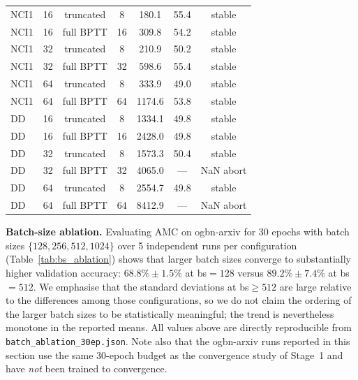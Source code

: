 \documentclass[a4paper,fleqn]{cas-dc}
\begin{document}
\begin{table}[htbp]
{\begin{tabular}{@{}lcccccc@{}}
NCI1     & 16 & truncated     & 8  & 180.1 & 55.4 & stable \\
NCI1     & 16 & full BPTT     & 16 & 309.8 & 54.2 & stable \\
NCI1     & 32 & truncated     & 8  & 210.9 & 50.2 & stable \\
NCI1     & 32 & full BPTT     & 32 & 598.6 & 55.4 & stable \\
NCI1     & 64 & truncated     & 8  & 333.9 & 49.0 & stable \\
NCI1     & 64 & full BPTT     & 64 & 1174.6 & 53.8 & stable \\
DD       & 16 & truncated     & 8  & 1334.1 & 49.8 & stable \\
DD       & 16 & full BPTT     & 16 & 2428.0 & 49.8 & stable \\
DD       & 32 & truncated     & 8  & 1573.3 & 50.4 & stable \\
DD       & 32 & full BPTT     & 32 & 4065.0 & ---  & NaN abort \\
DD       & 64 & truncated     & 8  & 2554.7 & 49.8 & stable \\
DD       & 64 & full BPTT     & 64 & 8412.9 & ---  & NaN abort \\
\bottomrule
\end{tabular}%
}
\end{table}

\textbf{Batch-size ablation.} Evaluating AMC on ogbn-arxiv for 30 epochs with batch sizes $\{128,256,512,1024\}$ over 5 independent runs per configuration (Table~\ref{tab:bs_ablation}) shows that larger batch sizes converge to substantially higher validation accuracy: $68.8\%\pm1.5\%$ at bs$=128$ versus $89.2\%\pm7.4\%$ at bs$=512$. We emphasise that the standard deviations at bs$\geq512$ are large relative to the differences among those configurations, so we do not claim the ordering of the larger batch sizes to be statistically meaningful; the trend is nevertheless monotone in the reported means. All values above are directly reproducible from \texttt{batch\_ablation\_30ep.json}. Note also that the ogbn-arxiv runs reported in this section use the same 30-epoch budget as the convergence study of Stage~1 and have \emph{not} been trained to convergence.

\begin{table}[htbp]
\caption{Batch-Size Ablation on ogbn-arxiv (30 epochs, 5 runs per configuration)}
\label{tab:bs_ablation}
\centering\footnotesize
{}
\end{table}
\end{document}
